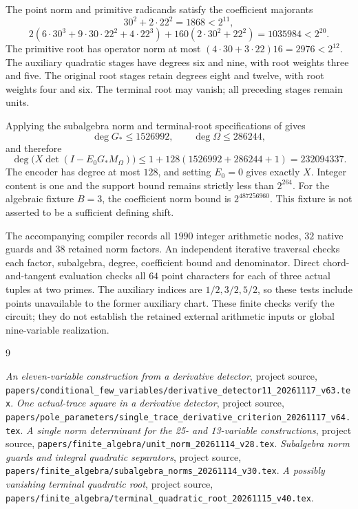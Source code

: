 \documentclass[11pt,a4paper]{article}
\begin{document}
The point norm and primitive radicands satisfy the coefficient
majorants
\[
 30^2+2\cdot22^2=1868<2^{11},
\]
\[
 2(6\cdot30^3+9\cdot30\cdot22^2+4\cdot22^3)
 +160(2\cdot30^2+22^2)=1035984<2^{20}.
\]
The primitive root has operator norm at most
$(4\cdot30+3\cdot22)16=2976<2^{12}$.
The auxiliary quadratic stages have degrees six and nine, with
root weights three and five. The original root stages retain
degrees eight and twelve, with root weights four and six.
The terminal root may vanish; all preceding stages remain units.

Applying the subalgebra norm and terminal-root specifications of
\cite{Subalgebra,Terminal} gives
\[
 \deg G_*\le1526992,\qquad \deg\Omega\le286244,
\]
and therefore
\[
 \deg\bigl(X\det(I-E_0G_*M_\Omega)\bigr)
 \le1+128(1526992+286244+1)=232094337.
\]
The encoder has degree at most $128$, and setting $E_0=0$ gives
exactly $X$. Integer content is one and the support bound remains
strictly less than $2^{264}$. For the algebraic fixture $B=3$, the
coefficient norm bound is $2^{487256960}$. This fixture is not
asserted to be a sufficient defining shift.

The accompanying compiler records all $1990$ integer arithmetic
nodes, $32$ native guards and $38$ retained norm factors. An
independent iterative traversal checks each factor, subalgebra,
degree, coefficient bound and denominator. Direct chord-and-tangent
evaluation checks all $64$ point characters for each of three
actual tuples at two primes. The auxiliary indices are
$1/2,3/2,5/2$, so these tests include points unavailable to the
former auxiliary chart. These finite checks verify the circuit;
they do not establish the retained external arithmetic inputs
or global nine-variable realization.

\begin{thebibliography}{9}\raggedright
{} \emph{An eleven-variable construction from a derivative detector},
project source, \nolinkurl{papers/conditional_few_variables/derivative_detector11_20261117_v63.tex}.
 \emph{One actual-trace square in a derivative detector},
project source, \nolinkurl{papers/pole_parameters/single_trace_derivative_criterion_20261117_v64.tex}.
 \emph{A single norm determinant for the 25- and 13-variable constructions},
project source, \nolinkurl{papers/finite_algebra/unit_norm_20261114_v28.tex}.
 \emph{Subalgebra norm guards and integral quadratic separators},
project source, \nolinkurl{papers/finite_algebra/subalgebra_norms_20261114_v30.tex}.
 \emph{A possibly vanishing terminal quadratic root},
project source, \nolinkurl{papers/finite_algebra/terminal_quadratic_root_20261115_v40.tex}.
\end{thebibliography}
\end{document}

